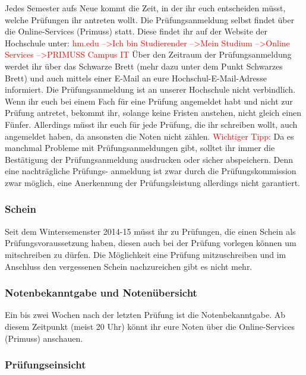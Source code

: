 Jedes Semester aufs Neue kommt die Zeit, in der ihr euch entscheiden müsst, welche Prüfungen ihr antreten wollt.\doublebreak
Die Prüfungsanmeldung selbst findet über die Online-Services (Primuss) statt. Diese findet ihr auf der Website der Hochschule unter:\doublebreak
\textcolor{red}{hm.edu --\textgreater Ich bin Studierender --\textgreater Mein Studium --\textgreater Online Services  --\textgreater PRIMUSS Campus IT}\doublebreak
Über den Zeitraum der Prüfungsanmeldung werdet ihr über das Schwarze Brett (mehr dazu unter dem Punkt \glqq Schwarzes Brett\grqq{}) und auch mittels einer E-Mail an eure Hochschul-E-Mail-Adresse informiert.\doublebreak
Die Prüfungsanmeldung ist an unserer Hochschule nicht verbindlich. Wenn ihr euch bei einem Fach für eine Prüfung angemeldet habt und nicht zur Prüfung antretet, bekommt ihr, solange keine Fristen anstehen, nicht gleich einen Fünfer. Allerdings müsst ihr euch für jede Prüfung, die ihr schreiben wollt, auch angemeldet haben, da ansonsten die Noten nicht zählen.\doublebreak 
\textcolor{red}{Wichtiger Tipp:} Da es manchmal Probleme mit Prüfungsanmeldungen gibt, solltet ihr immer die Bestätigung der Prüfungsanmeldung ausdrucken oder sicher abspeichern. Denn eine nachträgliche Prüfungs- anmeldung ist zwar durch die Prüfungskommission zwar möglich, eine Anerkennung der Prüfungsleistung allerdings nicht garantiert.

\subsubsection{Schein}
Seit dem Wintersemenster 2014-15 müsst ihr zu Prüfungen, die einen Schein als Prüfungsvoraussetzung haben, diesen auch bei der Prüfung vorlegen können um mitschreiben zu dürfen. Die Möglichkeit eine Prüfung mitzuschreiben und im Anschluss den vergessenen Schein nachzureichen gibt es nicht mehr.

\subsubsection{Notenbekanntgabe und Notenübersicht}

Ein bis zwei Wochen nach der letzten Prüfung ist die Notenbekanntgabe. Ab diesem Zeitpunkt (meist 20 Uhr) könnt ihr eure Noten über die Online-Services (Primuss) anschauen.

\subsubsection{Prüfungseinsicht}

